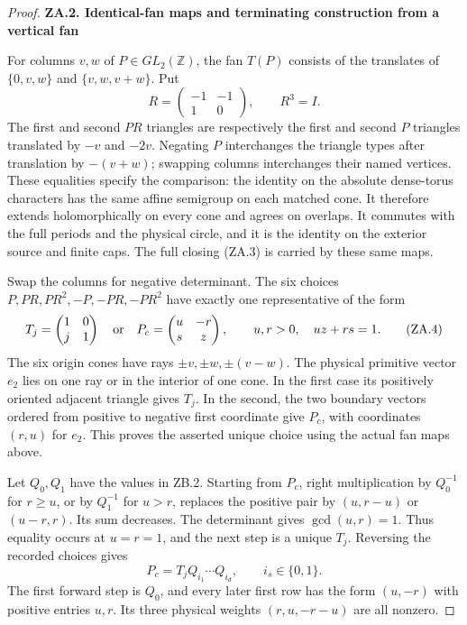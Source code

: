 \begin{proof}
\par

\medskip\noindent\textbf{ZA.2. Identical-fan maps and terminating construction from a vertical fan}

\par\nopagebreak[4]

For columns \(v,w\) of \(P\in GL_2(\mathbb Z)\), the fan
\(T(P)\) consists of the translates of
\(\{0,v,w\}\) and \(\{v,w,v+w\}\). Put
\[
R=\begin{pmatrix}-1&-1\\1&0\end{pmatrix},\qquad R^3=I.
\]
The first and second \(PR\) triangles are respectively the first
and second \(P\) triangles translated by \(-v\) and \(-2v\).
Negating \(P\) interchanges the triangle types after translation
by \(-(v+w)\); swapping columns interchanges their named vertices.
These equalities specify the comparison: the identity on the absolute
dense-torus characters has the same affine semigroup on each matched
cone. It therefore extends holomorphically on every cone and agrees
on overlaps. It commutes with the full periods and the physical circle,
and it is the identity on the exterior source and finite caps. The
full closing (ZA.3) is carried by these same maps.

Swap the columns for negative determinant. The six choices
\(P,PR,PR^2,-P,-PR,-PR^2\) have exactly one representative of the form
\[
T_j=\begin{pmatrix}1&0\\j&1\end{pmatrix}
\quad\hbox{or}\quad
P_c=\begin{pmatrix}u&-r\\s&z\end{pmatrix},
\qquad u,r>0,\quad uz+rs=1.                              \tag{ZA.4}
\]
The six origin cones have rays \(\pm v,\pm w,\pm(v-w)\).
The physical primitive vector \(e_2\) lies on one ray or in the
interior of one cone. In the first case its positively oriented
adjacent triangle gives \(T_j\). In the second, the two boundary
vectors ordered from positive to negative first coordinate give
\(P_c\), with coordinates \((r,u)\) for \(e_2\). This proves the
asserted unique choice using the actual fan maps above.

Let \(Q_0,Q_1\) have the values in ZB.2. Starting from \(P_c\),
right multiplication by \(Q_0^{-1}\) for \(r\ge u\), or by
\(Q_1^{-1}\) for \(u>r\), replaces the positive pair by
\((u,r-u)\) or \((u-r,r)\). Its sum decreases. The determinant
gives \(\gcd(u,r)=1\). Thus equality occurs at \(u=r=1\), and
the next step is a unique \(T_j\). Reversing the recorded choices
gives
\[
P_c=T_jQ_{i_1}\cdots Q_{i_d},\qquad i_s\in\{0,1\}.
                                                               \tag{ZA.5}
\]
The first forward step is \(Q_0\), and every later first row has
the form \((u,-r)\) with positive entries \(u,r\). Its three
physical weights \((r,u,-r-u)\) are all nonzero.


\end{proof}
